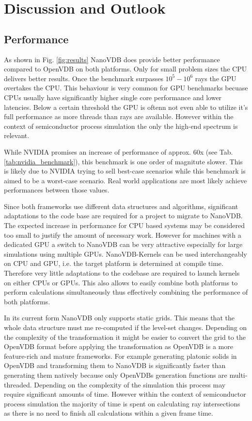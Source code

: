 \section{Discussion and Outlook}
\subsection{Performance}
As shown in Fig. \ref{fig:results} NanoVDB does provide better performance compared to OpenVDB on both platforms.
Only for small problem sizes the CPU delivers better results.
Once the benchmark surpasses $10^5 - 10^6$ rays the GPU overtakes the CPU.
This behaviour is very common for GPU benchmarks becuase CPUs usually have significantly higher single core performance and lower latencies.
Below a certain threshold the GPU is oftenn not even able to utilize it's full performance as more threads than rays are available.
However within the context of semiconductor process simulation the only the high-end spectrum is relevant.

While NVIDIA promises an increase of performance of approx. 60x (see Tab. \ref{tab:nvidia_benchmark}), this benchmark is one order of magnitute slower.
This is likely due to NVIDIA trying to sell best-case scenarios while this benchmark is aimed to be a worst-case scenario.
Real world applications are most likely achieve performances between those values.

Since both frameworks use different data structures and algorithms, significant adaptations to the code base are required for a project to migrate to NanoVDB.
The expected increase in performance for CPU based systems may be considered too small to justify the amount of necessary work.
However for machines with a dedicated GPU a switch to NanoVDB can be very attractive especially for large simulations using multiple GPUs.
NanoVDB-Kernels can be used interchangeably on CPU and GPU, i.e. the target platform is determined at compile time.
Therefore very little adaptations to the codebase are required to launch kernels on either CPUs or GPUs.
This also allows to easily combine both platforms to perform calculations simultaneously thus effectively combining the performance of both platforms.

In its current form NanoVDB only supports static grids.
This means that the whole data structure must me re-computed if the level-set changes.
Depending on the complexity of the transformation it might be easier to convert the grid to the OpenVDB format before applying the transformation as OpenVDB is a more feature-rich and mature frameworks.
For example generating platonic solids in OpenVDB and transforming them to NanoVDB is significantly faster than generating them natively because only OpenVDBs generation functions are multi-threaded.
Depending on the complexity of the simulation this process may require significant amounts of time.
However within the context of semiconductor process simulation the majority of time is spent on calculating ray intersections as there is no need to finish all calculations within a given frame time.

